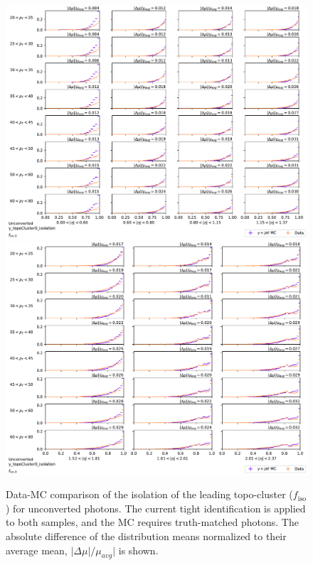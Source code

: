 \begin{figure}[!thp]
    \centering
    \includegraphics[width=.74\textwidth]{appendices/datamc_images/y_topoCluster0_isolation_Unconverted_lowerEta.pdf}
    \includegraphics[width=.74\textwidth]{appendices/datamc_images/y_topoCluster0_isolation_Unconverted_upperEta.pdf}
    \caption[Data-MC comparison of the isolation of the leading topo-cluster ($f_{\text{iso}}$)or unconverted photons]{Data-MC comparison of the isolation of the leading topo-cluster ($f_{\text{iso}}$) for unconverted photons. The current tight identification is applied to both samples, and the \gls{MC} requires truth-matched photons. The absolute difference of the distribution means normalized to their average mean, $|\Delta \mu|/\mu_{avg}|$ is shown.}
    \label{fig:dmc-u-iso}
\end{figure}



